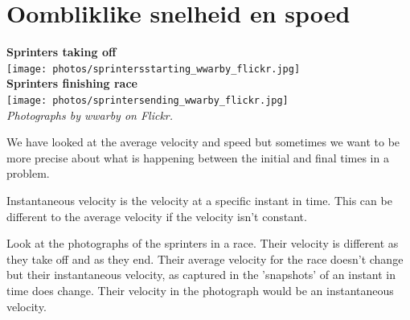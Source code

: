 \section{Oombliklike snelheid en spoed}


\begin{minipage}{.5\textwidth}
\begin{center}
\textbf{Sprinters taking off}\\
\texttt{[image: photos/sprintersstarting\_wwarby\_flickr.jpg]}\\
\textbf{Sprinters finishing race}\\
\texttt{[image: photos/sprintersending\_wwarby\_flickr.jpg]}\\
\textit{Photographs by wwarby on Flickr.}
\end{center}
\end{minipage}
\begin{minipage}{.5\textwidth}

We have looked at the average velocity and speed but sometimes we want to be more precise about what is happening between the initial and final times in a problem.


Instantaneous velocity is the velocity at a specific instant in time. This can be different to the average velocity if the velocity isn't constant.

Look at the photographs of the sprinters in a race. Their velocity is different as they take off and as they end. Their average velocity for the race doesn't change but their instantaneous velocity, as captured in the 'snapshots' of an instant in time does change. Their velocity in the photograph would be an instantaneous velocity.

\end{minipage}

\\




